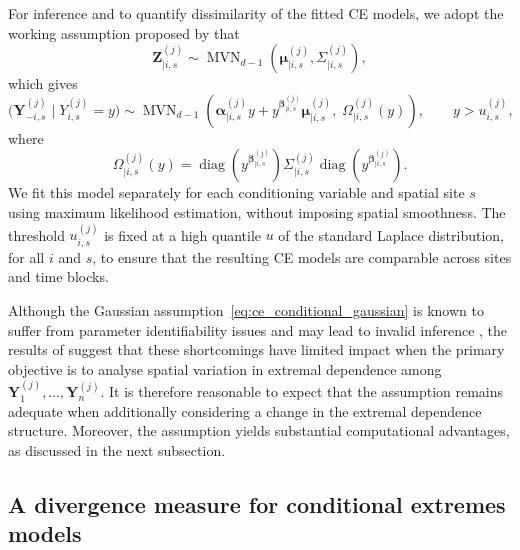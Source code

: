 \documentclass[APA,STIX1COL]{WileyNJD-v2}
\begin{document}
For inference and to quantify dissimilarity of the fitted CE models, we adopt the working assumption proposed by \citet{Heffernan2004} that
\[
\boldsymbol{Z}_{\mid i,s}^{(j)}
\sim
\operatorname{MVN}_{d-1}
\left(
\boldsymbol{\mu}_{\mid i,s}^{(j)},
\Sigma_{\mid i,s}^{(j)}
\right),
\]
which gives
\begin{equation}
\label{eq:ce_conditional_gaussian}
\bigl(\boldsymbol{Y}_{-i,s}^{(j)} \mid Y_{i,s}^{(j)} = y\bigr)
\sim
\operatorname{MVN}_{d-1}
\left(
\boldsymbol{\alpha}^{(j)}_{\mid i,s}y
+
y^{\boldsymbol{\beta}^{(j)}_{\mid i,s}}
\boldsymbol{\mu}^{(j)}_{\mid i,s},
\;
\Omega^{(j)}_{\mid i,s}(y)
\right),
\qquad y > u_{i,s}^{(j)},
\end{equation}
where
\[
\Omega^{(j)}_{\mid i,s}(y)
=
\operatorname{diag}
\left(
y^{\boldsymbol{\beta}^{(j)}_{\mid i,s}}
\right)
\Sigma_{\mid i,s}^{(j)}
\operatorname{diag}
\left(
y^{\boldsymbol{\beta}_{\mid i,s}^{(j)}}
\right).
\]
We fit this model separately for each conditioning variable and spatial site $s$ using maximum likelihood estimation, without imposing spatial smoothness. The threshold $u_{i,s}^{(j)}$ is fixed at a high quantile $u$ of the standard Laplace distribution, for all $i$ and $s$, to ensure that the resulting CE models are comparable across sites and time blocks.

Although the Gaussian assumption~\eqref{eq:ce_conditional_gaussian} is known to suffer from parameter identifiability issues and may lead to invalid inference \citep{Keef2012_flooding}, the results of \cite{OToole2026clustering} suggest that these shortcomings have limited impact when the primary objective is to analyse spatial variation in extremal dependence among $\boldsymbol{Y}_1^{(j)}, \ldots,\boldsymbol{Y}_n^{(j)}$. It is therefore reasonable to expect that the assumption remains adequate when additionally considering a change in the extremal dependence structure. Moreover, the assumption yields substantial computational advantages, as discussed in the next subsection.

\subsection{A divergence measure for conditional extremes models}
\label{subsec:div}
\end{document}
